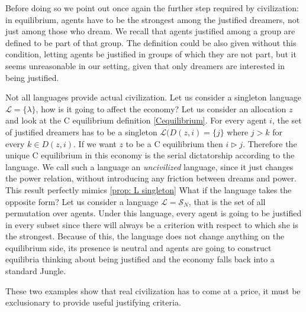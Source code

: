 



Before doing so we point out once again the further step required by civilization: in equilibrium, agents have to be the strongest among the justified dreamers, not just among those who dream. We recall that agents justified among a group are defined to be part of that group. The definition could be also given without this condition, letting agents be justified in groups of which they are not part, but it seems unreasonable in our setting, given that only dreamers are interested in being justified.

\begin{example}
    Not all languages provide actual civilization. Let us consider a singleton language $\mathcal{L}=\{\lambda\}$, how is it going to affect the economy? Let us consider an allocation $z$ and look at the C equilibrium definition \ref{Cequilibrium}. For every agent $i$, the set of justified dreamers has to be a singleton ${\mathcal{L}}(D(z,i)=\{j\}$ where $j>k$ for every $k\in D(z,i)$. If we want $z$ to be a C equilibrium then $i\triangleright j$. Therefore the unique C equilibrium in this economy is the serial dictatorship according to the language. We call such a language an \textit{uncivilized} language, since it just changes the power relation, without introducing any friction between dreams and power. This result perfectly mimics \cref{prop: L singleton} What if the language takes the opposite form? Let us consider a language $\mathcal{L}=\mathcal{S}_N$, that is the set of all permutation over agents.  Under this language, every agent is going to be justified in every subset since there will always be a criterion with respect to which she is the strongest. Because of this, the language does not change anything on the equilibrium side, its presence is neutral and agents are going to construct equilibria thinking about being justified and the economy falls back into a standard Jungle.

    These two examples show that real civilization has to come at a price, it must be exclusionary to provide useful justifying criteria.
\end{example}

